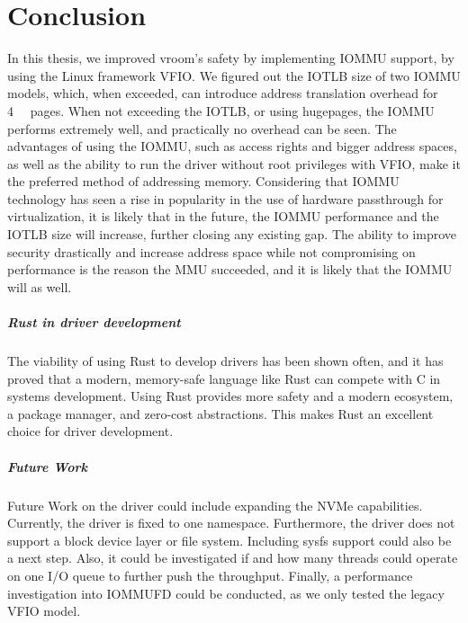 \chapter{Conclusion}
In this thesis, we improved vroom's safety by implementing IOMMU support, by using the Linux framework VFIO.
We figured out the IOTLB size of two IOMMU models, which, when exceeded, can introduce address translation overhead for \qty{4}{\kibi\byte} pages.
When not exceeding the IOTLB, or using hugepages, the IOMMU performs extremely well, and practically no overhead can be seen.
The advantages of using the IOMMU, such as access rights and bigger address spaces, as well as the ability to run the driver without root privileges with VFIO, make it the preferred method of addressing memory.
Considering that IOMMU technology has seen a rise in popularity in the use of hardware passthrough for virtualization, it is likely that in the future, the IOMMU performance and the IOTLB size will increase, further closing any existing gap. The ability to improve security drastically and increase address space while not compromising on performance is the reason the MMU succeeded, and it is likely that the IOMMU will as well.

\paragraph{Rust in driver development}
The viability of using Rust to develop drivers has been shown often, and it has proved that a modern, memory-safe language like Rust can compete with C in systems development. Using Rust provides more safety and a modern ecosystem, a package manager, and zero-cost abstractions. This makes Rust an excellent choice for driver development.

\paragraph{Future Work}
Future Work on the driver could include expanding the NVMe capabilities. Currently, the driver is fixed to one namespace. Furthermore, the driver does not support a block device layer or file system. Including sysfs support could also be a next step.
Also, it could be investigated if and how many threads could operate on one I/O queue to further push the throughput. Finally, a performance investigation into IOMMUFD could be conducted, as we only tested the legacy VFIO model.